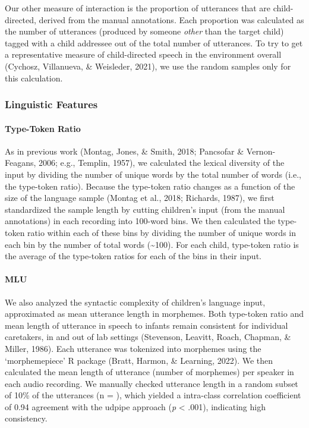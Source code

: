 \documentclass[
  man]{apa6}
\let\oldparagraph\paragraph
\renewcommand{\paragraph}[1]{\oldparagraph{#1}\mbox{}}
\begin{document}
Our other measure of interaction is the proportion of utterances that are child-directed, derived from the manual annotations. Each proportion was calculated as the number of utterances (produced by someone \emph{other} than the target child) tagged with a child addressee out of the total number of utterances. To try to get a representative measure of child-directed speech in the environment overall (Cychosz, Villanueva, \& Weisleder, 2021), we use the random samples only for this calculation.

\hypertarget{linguistic-features}{%
\subsubsection{Linguistic Features}\label{linguistic-features}}

\hypertarget{type-token-ratio}{%
\paragraph{Type-Token Ratio}\label{type-token-ratio}}

As in previous work (Montag, Jones, \& Smith, 2018; Pancsofar \& Vernon-Feagans, 2006; e.g., Templin, 1957), we calculated the lexical diversity of the input by dividing the number of unique words by the total number of words (i.e., the type-token ratio). Because the type-token ratio changes as a function of the size of the language sample (Montag et al., 2018; Richards, 1987), we first standardized the sample length by cutting children's input (from the manual annotations) in each recording into 100-word bins. We then calculated the type-token ratio within each of these bins by dividing the number of unique words in each bin by the number of total words (\textasciitilde100). For each child, type-token ratio is the average of the type-token ratios for each of the bins in their input.

\hypertarget{mlu}{%
\paragraph{MLU}\label{mlu}}

We also analyzed the syntactic complexity of children's language input, approximated as mean utterance length in morphemes. Both type-token ratio and mean length of utterance in speech to infants remain consistent for individual caretakers, in and out of lab settings (Stevenson, Leavitt, Roach, Chapman, \& Miller, 1986). Each utterance was tokenized into morphemes using the `morphemepiece' R package (Bratt, Harmon, \& Learning, 2022). We then calculated the mean length of utterance (number of morphemes) per speaker in each audio recording. We manually checked utterance length in a random subset of 10\% of the utterances (n = ), which yielded a intra-class correlation coefficient of 0.94 agreement with the udpipe approach (\emph{p} \textless{} .001), indicating high consistency.
\end{document}
